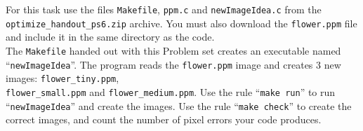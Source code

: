 \documentclass[10pt,a4paper]{article}
\begin{document}
For this task use the files \texttt{Makefile}, \texttt{ppm.c} and \texttt{newImageIdea.c} from the \texttt{optimize\_handout\_ps6.zip} archive. You must also download the \texttt{flower.ppm} file and include it in the same directory as the code.\\

The \texttt{Makefile}  handed out with this Problem set creates an executable named ``\texttt{newImageIdea}''. The program reads the \texttt{flower.ppm} image and creates 3 new images: \texttt{flower\_tiny.ppm},\\ \texttt{flower\_small.ppm} and \texttt{flower\_medium.ppm}.
Use the rule ``\texttt{make run}'' to run ``\texttt{newImageIdea}'' and create the images. Use the rule ``\texttt{make check}'' to create the correct images, and count the number of pixel errors your code produces.
\\
\end{document}
